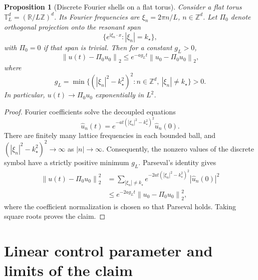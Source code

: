 \documentclass[11pt]{article}
\newtheorem{proposition}[theorem]{Proposition}
\theoremstyle{remark}
\newcommand{\R}{\mathbb{R}}
\newcommand{\T}{\mathbb{T}}
\newcommand{\ii}{\mathrm{i}}
\newcommand{\norm}[1]{\left\lVert #1\right\rVert}
\newcommand{\abs}[1]{\left\lvert #1\right\rvert}
\begin{document}
\begin{proposition}[Discrete Fourier shells on a flat torus]
Consider a flat torus $\T_L^d=(\R/L\mathbb Z)^d$.  Its Fourier
frequencies are $\xi_n=2\pi n/L$, $n\in\mathbb Z^d$.  Let $\Pi_0$
denote orthogonal projection onto the resonant span
\begin{equation}
\{e^{\ii\xi_n\cdot x}:\abs{\xi_n}=k_\star\},
\end{equation}
with $\Pi_0=0$ if that span is trivial.  Then for a constant $g_L>0$,
\begin{equation}\label{eq:periodic-gap}
\norm{u(t)-\Pi_0u_0}_2
\le e^{-ag_Lt}\norm{u_0-\Pi_0u_0}_2,
\end{equation}
where
\begin{equation}
g_L=\min\{(\abs{\xi_n}^2-k_\star^2)^2:
 n\in\mathbb Z^d,\ \abs{\xi_n}\ne k_\star\}>0.
\end{equation}
In particular, $u(t)\to\Pi_0u_0$ exponentially in $L^2$.
\end{proposition}
\begin{proof}
Fourier coefficients solve the decoupled equations
\begin{equation}
\widehat u_n(t)
=e^{-at(\abs{\xi_n}^2-k_\star^2)^2}\widehat u_n(0).
\end{equation}
There are finitely many lattice frequencies in each bounded ball, and
$(\abs{\xi_n}^2-k_\star^2)^2\to\infty$ as $\abs n\to\infty$.
Consequently, the nonzero values of the discrete symbol have a strictly
positive minimum $g_L$.  Parseval's identity gives
\begin{align}
\norm{u(t)-\Pi_0u_0}_2^2
&=\sum_{\abs{\xi_n}\ne k_\star}
 e^{-2at(\abs{\xi_n}^2-k_\star^2)^2}
 \abs{\widehat u_n(0)}^2\\
&\le e^{-2ag_Lt}\norm{u_0-\Pi_0u_0}_2^2,
\end{align}
where the coefficient normalization is chosen so that Parseval holds.
Taking square roots proves the claim.
\end{proof}

\section{Linear control parameter and limits of the claim}
\end{document}
